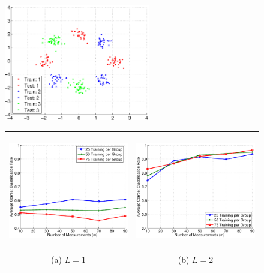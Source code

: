 \documentclass[twoside,11pt]{article}
\begin{document}
\begin{figure}[!htbp]
\centering
\includegraphics[height=2in]{images/Synthetic/8ball_g3_d2/synthetic_4a.eps} 
\begin{tabular}{cc}
\includegraphics[height=2in]{images/Synthetic/8ball_g3_d2/synthetic_4b.eps} &
\includegraphics[height=2in]{images/Synthetic/8ball_g3_d2/synthetic_4c.eps} \\
(a) $L=1$ & (b) $L=2$ \\

\end{tabular}
\end{figure}
\end{document}
